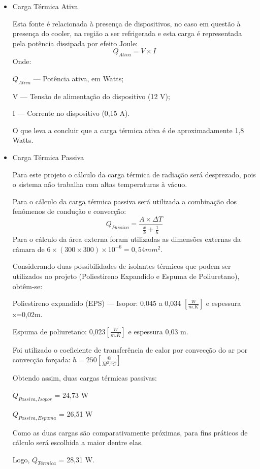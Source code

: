 \begin{itemize}
\item Carga Térmica Ativa

Esta  fonte é relacionada à presença de dispositivos, no caso em questão à presença do cooler, na região a ser refrigerada e esta carga é representada pela potência dissipada por efeito Joule:
\begin{equation}
Q_{Ativa} = V \times I
\end{equation}
Onde:

$Q_{Ativa}$ --- Potência ativa, em Watts;

V --- Tensão de alimentação do dispositivo (12 V);


I --- Corrente no dispositivo (0,15 A).

O que leva a concluir que a carga térmica ativa é de aproximadamente 1,8 Watts.

\item Carga Térmica Passiva

Para este projeto o cálculo da carga térmica de radiação será desprezado, pois o sistema não trabalha com altas temperaturas à vácuo.

Para o cálculo da carga térmica passiva será utilizada a combinação dos fenômenos de condução e convecção:
\begin{equation}
	Q_{Passivo}= \frac{A \times \Delta T}{\frac{x}{k} + \frac{1}{h}}
\end{equation}
Para o cálculo da área externa foram utilizadas as dimensões externas da câmara de $6\times(300 \times 300)\times 10^{-6}=0,54mm^2$. 

Considerando duas possibilidades de isolantes térmicos que podem ser utilizados no projeto (Poliestireno Expandido e Espuma de Poliuretano), obtêm-se:

Poliestireno expandido (EPS) --- Isopor: 0,045 a 0,034 $\left[\frac{W}{m.K}\right]$ e espessura x=0,02m.

Espuma de poliuretano: 0,023$\left[\frac{W}{m.K}\right]$ e espessura 0,03 m.

Foi utilizado o coeficiente de transferência de calor por convecção do ar por convecção forçada: $h = 250 \left[\frac{@}{M^2.ºC}\right] $

Obtendo assim, duas cargas térmicas passivas:

$Q_{Passiva, Isopor}$ = 24,73 W

$Q_{Passiva, Espuma} $ = 26,51 W

Como as duas cargas são comparativamente próximas, para fins práticos de cálculo será escolhida a maior dentre elas.

Logo, $Q_{Térmica}$ = 28,31 W.

\end{itemize}

